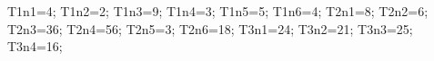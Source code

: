 \documentclass[exercice]{thedocument}%
\begin{document}
%
    \>T1n1=4;%
    \>T1n2=2;%
    \>T1n3=9;%
    \>T1n4=3;%
    \>T1n5=5;%
    \>T1n6=4;%
    \>T2n1=8;%
    \>T2n2=6;%
    \>T2n3=36;%
    \>T2n4=56;%
    \>T2n5=3;%
    \>T2n6=18;%
    \>T3n1=24;%
    \>T3n2=21;%
    \>T3n3=25;%
    \>T3n4=16;%
\end{document}
